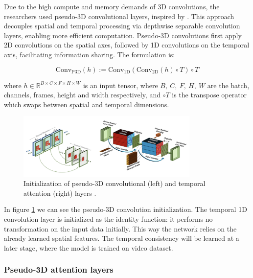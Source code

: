 Due to the high compute and memory demands of 3D convolutions, the researchers used pseudo-3D convolutional layers, inspired by \cite{chollet2017xception}. This approach decouples spatial and temporal processing via depthwise separable convolution layers, enabling more efficient computation. Pseudo-3D convolutions first apply 2D convolutions on the spatial axes, followed by 1D convolutions on the temporal axis, facilitating information sharing. The formulation is:

\[ 
\text{Conv}_{\text{P3D}} (h) := \text{Conv}_{\text{1D}} (
    \text{Conv}_{\text{2D}} (h) \circ T
) \circ T \]

where $h \in \mathbb{R}^{B\times C\times F\times H\times W}$ is an input tensor, where $B,\ C,\ F,\ H,\ W$ are the batch, channels, frames, height and width respectively, and $\circ T$ is the transpose operator which swaps between spatial and temporal dimensions.

\begin{figure}
    \centering
    \includegraphics[width=0.8\textwidth]{images/make_a_video/pseudo_3d.png}
    \caption{Initialization of pseudo-3D convolutional (left) and temporal attention (right) layers \cite{make_a_video}.}
    \label{fig:make_a_video_pseudo_3d_conv_and_attention}
\end{figure}

In figure \ref{fig:make_a_video_pseudo_3d_conv_and_attention} we can see the pseudo-3D convolution initialization. The temporal 1D convolution layer is initialized as the identity function: it performs no transformation on the input data initially. This way the network relies on the already learned spatial features. The temporal consistency will be learned at a later stage, where the model is trained on video dataset.












\subsubsection{Pseudo-3D attention layers}

